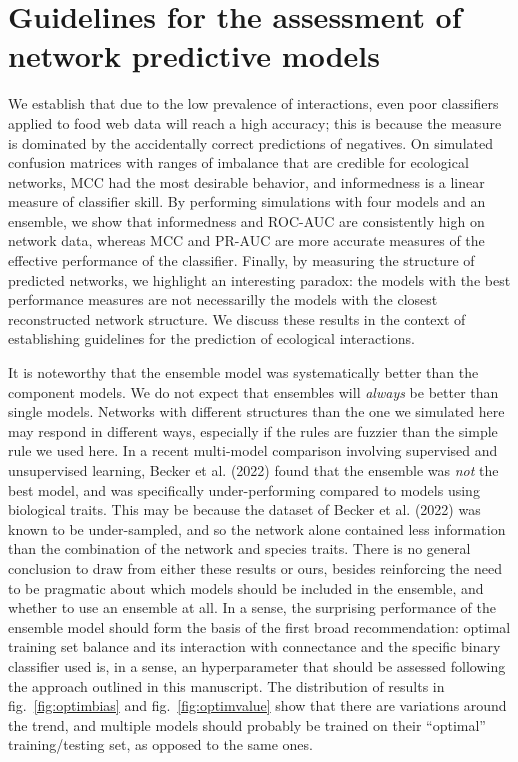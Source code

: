 \documentclass[11pt]{article}
\begin{document}
\hypertarget{guidelines-for-the-assessment-of-network-predictive-models}{%
\section{Guidelines for the assessment of network predictive
models}\label{guidelines-for-the-assessment-of-network-predictive-models}}

We establish that due to the low prevalence of interactions, even poor
classifiers applied to food web data will reach a high accuracy; this is
because the measure is dominated by the accidentally correct predictions
of negatives. On simulated confusion matrices with ranges of imbalance
that are credible for ecological networks, MCC had the most desirable
behavior, and informedness is a linear measure of classifier skill. By
performing simulations with four models and an ensemble, we show that
informedness and ROC-AUC are consistently high on network data, whereas
MCC and PR-AUC are more accurate measures of the effective performance
of the classifier. Finally, by measuring the structure of predicted
networks, we highlight an interesting paradox: the models with the best
performance measures are not necessarilly the models with the closest
reconstructed network structure. We discuss these results in the context
of establishing guidelines for the prediction of ecological
interactions.

It is noteworthy that the ensemble model was systematically better than
the component models. We do not expect that ensembles will \emph{always}
be better than single models. Networks with different structures than
the one we simulated here may respond in different ways, especially if
the rules are fuzzier than the simple rule we used here. In a recent
multi-model comparison involving supervised and unsupervised learning,
Becker et al. (2022) found that the ensemble was \emph{not} the best
model, and was specifically under-performing compared to models using
biological traits. This may be because the dataset of Becker et al.
(2022) was known to be under-sampled, and so the network alone contained
less information than the combination of the network and species traits.
There is no general conclusion to draw from either these results or
ours, besides reinforcing the need to be pragmatic about which models
should be included in the ensemble, and whether to use an ensemble at
all. In a sense, the surprising performance of the ensemble model should
form the basis of the first broad recommendation: optimal training set
balance and its interaction with connectance and the specific binary
classifier used is, in a sense, an hyperparameter that should be
assessed following the approach outlined in this manuscript. The
distribution of results in fig.~\ref{fig:optimbias} and
fig.~\ref{fig:optimvalue} show that there are variations around the
trend, and multiple models should probably be trained on their
``optimal'' training/testing set, as opposed to the same ones.
\end{document}
